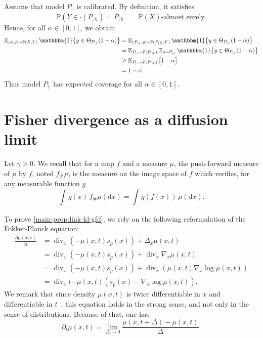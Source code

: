 \documentclass{uai2023} %
\begin{document}
Assume that model $P_{|\cdot}$ is calibrated.
By definition, it satisfies
\begin{equation*}
    \mathbb{P}(Y \in \cdot \mid P_{|X}) = P_{|X} \qquad \mathbb{P}(X)\text{-almost surely}.
\end{equation*}
Hence, for all $\alpha \in [0,1]$, we obtain
\begin{equation*}
\begin{split}
     \E_{(x, y) \sim \mathbb{P}(X, Y)} \mathbbm{1}\big\{y \in \Theta_{P_{|x}}(1 - \alpha)\big\} 
     &= \E_{(P_{|x}, y) \sim \mathbb{P}(P_{|X}, Y)} \mathbbm{1}\big\{y \in \Theta_{P_{|x}}(1 - \alpha)\big\} \\
     &= \E_{P_{|x} \sim \mathbb{P}(P_{|X})} \E_{y \sim P_{|x}} \mathbbm{1}\big\{y \in \Theta_{P_{|x}}(1 - \alpha)\big\} \\
     &\geq \E_{P_{|x} \sim \mathbb{P}(P_{|X})} \big[1 - \alpha \big] \\
     &= 1 - \alpha.
\end{split}
\end{equation*}
Thus model $P_{|\cdot}$ has expected coverage for all $\alpha \in [0, 1]$.

\section{Fisher divergence as a diffusion limit}\label{app-sec:limit-fisher-divergence}


Let $\gamma > 0$. We recall that for a map $ f $  and a measure  $ \mu $, the push-forward measure of $ \mu $ by $ f $, noted $ f_{\#} \mu $, 
is the measure on the image space of $ f $ which verifies, for any measurable function $ g $
\begin{equation*}
    \int_{  }^{  } g(x) \, f_{\#} \mu(\mathrm{d}x) = \int_{  }^{  } g(f(x)) \, \mu(\mathrm{d}x).
\end{equation*}

To prove \cref{main-prop:link-kl-gfd}, we rely on the following reformulation of the Fokker-Planck equation:
\begin{equation*}
\begin{split}
    \frac{\partial \mu(x, t)}{\partial t} &= \operatorname{div}_x(-\mu(x, t) s_p(x)) + \Delta_x \mu(x, t) \\
					  &= \operatorname{div}_x(-\mu(x, t) s_p(x)) + \operatorname{div}_x \nabla_{ x } \mu(x, t) \\
					  &= \operatorname{div}_x(-\mu(x, t) s_p(x)) + \operatorname{div}_x(\mu(x, t) \nabla_x \log \mu(x, t)) \\
					  &= \operatorname{div}_x(- \mu(x, t)(s_p(x) - \nabla_x \log \mu(x, t)).
\end{split}
\end{equation*}
We remark that since density $\mu(x, t)$ is twice differentiable in $ x $ and differentiable in $ t $~\citep{johnson2004information}, this equation holds in the strong sense, and not only in the sense of distributions. Because of that, one has
\begin{equation*}
    \partial_t \mu(x, t) = \lim_{ \Delta \to 0 } \frac{\mu(x, t + \Delta) - \mu(x, t)}{\Delta}.
\end{equation*}
\end{document}
